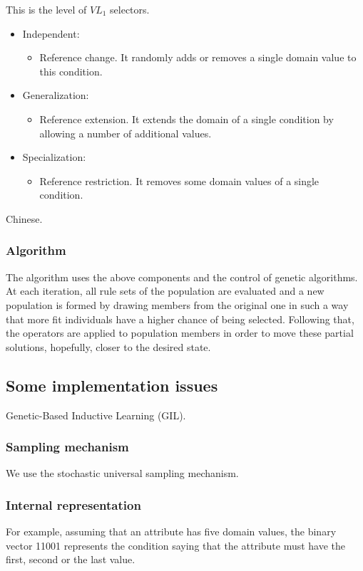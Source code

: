 \documentclass[12pt]{article}
\newcounter{subsubsubsection}[subsubsection]
\begin{document}
This is the level of $VL_1$ selectors.
\begin{itemize}
\item Independent:
\begin{itemize}
\item Reference change. It randomly adds or removes a single domain value to this condition.
\end{itemize}
\item Generalization:
\begin{itemize}
\item Reference extension. It extends the domain of a single condition by allowing a number of additional values.
\end{itemize}
\item Specialization:
\begin{itemize}
\item Reference restriction. It removes some domain values of a single condition.
\end{itemize}
\end{itemize}

Chinese.

\subsubsection{Algorithm}
The algorithm uses the above components and the control of genetic algorithms. At each iteration, all rule sets of the population are evaluated and a new population is formed by drawing members from the original one in such a way that more fit individuals have a higher chance of being selected. Following that, the operators are applied to population members in order to move these partial solutions, hopefully, closer to the desired state.

\subsection{Some implementation issues}
Genetic-Based Inductive Learning (GIL).

\subsubsection{Sampling mechanism}
We use the stochastic universal sampling mechanism.

\subsubsection{Internal representation}
For example, assuming that an attribute has five domain values, the binary vector 11001 represents the condition saying that the attribute must have the first, second or the last value.
\end{document}
